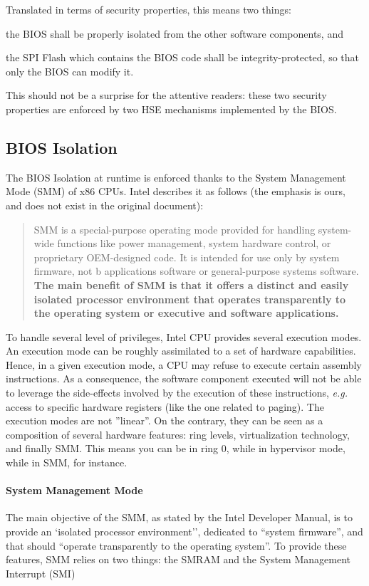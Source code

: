 Translated in terms of security properties, this means two things:
%
\begin{inparaenum}[(1)]
\item the BIOS shall be properly isolated from the other software components,
  and
\item the SPI Flash which contains the BIOS code shall be integrity-protected,
  so that only the BIOS can modify it.
\end{inparaenum}
%
This should not be a surprise for the attentive readers: these two security
properties are enforced by two HSE mechanisms implemented by the BIOS.

\subsection{BIOS Isolation}

The BIOS Isolation at runtime is enforced thanks to the System Management Mode
(SMM) of x86 CPUs.
%
Intel describes it as follows (the emphasis is ours, and does not exist in the
original document):

\begin{quote}
  SMM is a special-purpose operating mode provided for handling system-wide
  functions like power management, system hardware control, or proprietary
  OEM-designed code.
  It is intended for use only by system firmware, not b applications software or
  general-purpose systems software.
  \textbf{The main benefit of SMM is that it offers a distinct and easily
    isolated processor environment that operates transparently to the operating
    system or executive and software applications.}
\end{quote}

To handle several level of privileges, Intel CPU provides several execution
modes.
%
An execution mode can be roughly assimilated to a set of hardware capabilities.
%
Hence, in a given execution mode, a CPU may refuse to execute certain assembly
instructions.
%
As a consequence, the software component executed will not be able to leverage
the side-effects involved by the execution of these instructions, \emph{e.g.}
access to specific hardware registers (like the one related to paging).
%
The execution modes are not ''linear''.
%
On the contrary, they can be seen as a composition of several hardware features:
ring levels, virtualization technology, and finally SMM.
%
This means you can be in ring 0, while in hypervisor mode, while in SMM, for
instance.

\paragraph{System Management Mode}
%
The main objective of the SMM, as stated by the Intel Developer Manual, is to
provide an `isolated processor environment'', dedicated to ``system firmware'',
and that should ``operate transparently to the operating system''.
%
To provide these features, SMM relies on two things: the SMRAM and the System
Management Interrupt (SMI)

